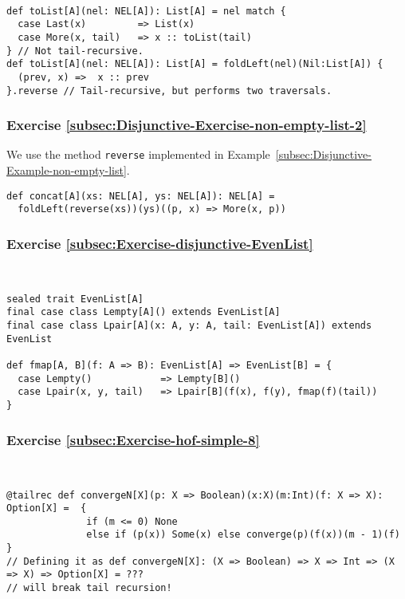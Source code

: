~
\begin{lstlisting}
def toList[A](nel: NEL[A]): List[A] = nel match {
  case Last(x)         => List(x)
  case More(x, tail)   => x :: toList(tail)
} // Not tail-recursive.
def toList[A](nel: NEL[A]): List[A] = foldLeft(nel)(Nil:List[A]) {
  (prev, x) =>  x :: prev
}.reverse // Tail-recursive, but performs two traversals.
\end{lstlisting}


\subsubsection*{Exercise \ref{subsec:Disjunctive-Exercise-non-empty-list-2}}

We use the method \lstinline!reverse! implemented in Example~\ref{subsec:Disjunctive-Example-non-empty-list}.
\begin{lstlisting}
def concat[A](xs: NEL[A], ys: NEL[A]): NEL[A] =
  foldLeft(reverse(xs))(ys)((p, x) => More(x, p))
\end{lstlisting}


\subsubsection*{Exercise \ref{subsec:Exercise-disjunctive-EvenList}}

~
\begin{lstlisting}
sealed trait EvenList[A]
final case class Lempty[A]() extends EvenList[A]
final case class Lpair[A](x: A, y: A, tail: EvenList[A]) extends EvenList

def fmap[A, B](f: A => B): EvenList[A] => EvenList[B] = {
  case Lempty()            => Lempty[B]()
  case Lpair(x, y, tail)   => Lpair[B](f(x), f(y), fmap(f)(tail))
}
\end{lstlisting}



\subsubsection*{Exercise \ref{subsec:Exercise-hof-simple-8}}

~
\begin{lstlisting}
@tailrec def convergeN[X](p: X => Boolean)(x:X)(m:Int)(f: X => X): Option[X] =  {
              if (m <= 0) None
              else if (p(x)) Some(x) else converge(p)(f(x))(m - 1)(f)             }
// Defining it as def convergeN[X]: (X => Boolean) => X => Int => (X => X) => Option[X] = ???
// will break tail recursion!
\end{lstlisting}


